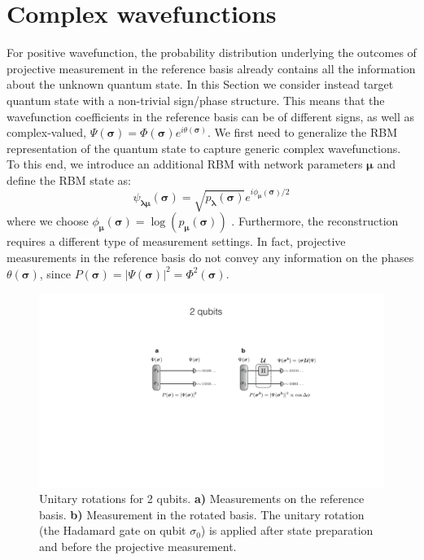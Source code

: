 \documentclass[submission, Phys]{SciPost}
\begin{document}
\section{Complex wavefunctions}
\label{sec::complex}
For positive wavefunction, the probability distribution underlying the outcomes of projective measurement in the reference basis already contains all the information about the unknown quantum state. In this Section we consider instead target quantum state with a non-trivial sign/phase structure. This means that the wavefunction coefficients in the reference basis can be of different signs, as well as complex-valued, $\Psi(\bm{\sigma})=\Phi(\bm{\sigma})e^{i\theta(\bm{\sigma})}$. We first need to generalize the RBM representation of the quantum state to capture generic complex wavefunctions. To this end, we introduce an additional RBM with network parameters $\bm{\mu}$ and define the RBM state as:
\begin{equation}
\psi_{\bm{\lambda} \bm{\mu}} (\bm{\sigma})= \sqrt{p_{\bm{\lambda}} (\bm{\sigma})} e^{i \phi_{\bm{\mu}} (\bm{\sigma})/2}
\end{equation}
where we choose $\phi_{\bm{\mu}}(\bm{\sigma}) = \log (p_{\bm{\mu}} (\bm{\sigma}))$ \cite{torlai2018tomography}. Furthermore, the reconstruction requires a different type of measurement settings. In fact, projective measurements in the reference basis do not convey any information on the phases $\theta(\bm{\sigma})$, since $P(\bm{\sigma})=|\Psi(\bm{\sigma})|^2=\Phi^2(\bm{\sigma})$.




\begin{figure}[t!]
\noindent \centering{}\includegraphics[width=\columnwidth]{plots/2qubits_rotation}
\caption[The quantum many-body problem]{Unitary rotations for 2 qubits. {\bf a)} Measurements on the reference basis. {\bf b)} Measurement in the rotated basis. The unitary rotation (the Hadamard gate on qubit $\sigma_0$) is applied after state preparation and before the projective measurement.}
\label{phase_learn} 
\end{figure}
\end{document}

